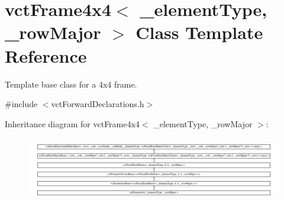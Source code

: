\hypertarget{classvct_frame4x4}{\section{vct\-Frame4x4$<$ \-\_\-element\-Type, \-\_\-row\-Major $>$ Class Template Reference}
\label{classvct_frame4x4}
}


Template base class for a 4x4 frame.  




{\ttfamily \#include $<$vct\-Forward\-Declarations.\-h$>$}

Inheritance diagram for vct\-Frame4x4$<$ \-\_\-element\-Type, \-\_\-row\-Major $>$\-:\begin{figure}[H]
\begin{center}
\leavevmode
\includegraphics[height=2.840237cm]{d7/dc1/classvct_frame4x4}
\end{center}
\end{figure}
